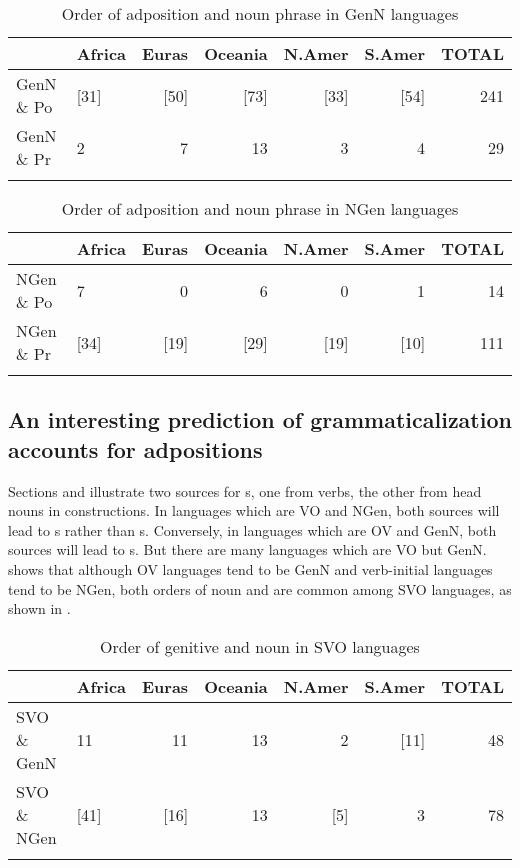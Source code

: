 \documentclass[output=paper]{langsci/langscibook}
\begin{document}
\begin{table}
\begin{tabularx}{\textwidth}{Xlrrrrr}
\lsptoprule
& \bfseries Africa & \bfseries Euras & \bfseries Oceania & \bfseries N.Amer & \bfseries S.Amer & \bfseries TOTAL\\
\midrule 
GenN \& Po & [31] & [50] & [73] & [33] & [54] & 241\\
GenN \& Pr & 2 & 7 & 13 & 3 & 4 & 29\\
\lspbottomrule
\end{tabularx}
\caption{\label{tab:dryer:3}Order of adposition and noun phrase in GenN languages}
\end{table}


\begin{table}
\begin{tabularx}{\textwidth}{Xlrrrrr}
\lsptoprule
& \bfseries Africa & \bfseries Euras & \bfseries Oceania & \bfseries N.Amer & \bfseries S.Amer & \bfseries TOTAL\\
\midrule 
NGen \& Po & 7 & 0 & 6 & 0 & 1 & 14\\
NGen \& Pr & [34] & [19] & [29] & [19] & [10] & 111\\
\lspbottomrule
\end{tabularx}
\caption{\label{tab:dryer:4}Order of adposition and noun phrase in NGen languages}
\end{table}


\subsection{An interesting prediction of grammaticalization accounts for adpositions}\label{sec:dryer:2.3}


Sections  and  illustrate two  sources for s, one from verbs, the other from head nouns in  constructions. In languages which are VO and NGen, both sources will lead to s rather than s. Conversely, in languages which are OV and GenN, both sources will lead to s. But there are many languages which are VO but GenN. \citet{Dryer1997_Six,Dryer2013_Six2} shows that although OV languages tend to be GenN and verb-initial languages tend to be NGen, both orders of noun and  are common among SVO languages, as shown in .

\begin{table}
\begin{tabularx}{\textwidth}{Xlrrrrr} 
\lsptoprule
& \bfseries Africa & \bfseries Euras & \bfseries Oceania & \bfseries N.Amer & \bfseries S.Amer & \bfseries TOTAL\\
\midrule
SVO \& GenN & 11 & 11 & 13 & 2 & [11] & 48\\
SVO \& NGen & [41] & [16] & 13 & [5] & 3 & 78\\
\lspbottomrule
\end{tabularx}
\caption{\label{tab:dryer:5}Order of genitive and noun in SVO languages}
\end{table}
\end{document}
